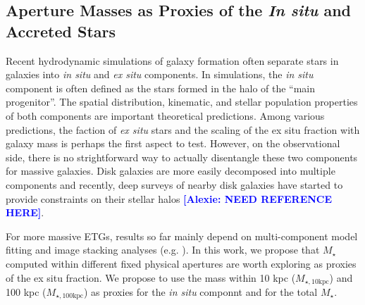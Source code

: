 \documentclass[a4paper,fleqn,usenatbib]{mnras}
\def\mstar{{$M_{\star}$}}
\def\minn{{$M_{\star,10\mathrm{kpc}}$}}
\def\mtot{{$M_{\star,100\mathrm{kpc}}$}}
\newcommand{\alexie}[1]{\textcolor{blue}{\textbf{[Alexie: #1]}}}
\begin{document}

\subsection{Aperture Masses as Proxies of the \textit{In situ} and Accreted Stars}
    \label{ssec:insitu}
    
    Recent hydrodynamic simulations of galaxy formation often separate stars in 
    galaxies into \textit{in situ} and \textit{ex situ} components. 
    In simulations, the \textit{in situ} component is often defined as the stars formed 
    in the halo of the ``main progenitor''.  
    The spatial distribution, kinematic, and stellar population properties of both 
    components are important theoretical predictions. Among various predictions,  the faction of  \textit{ex situ} stars and the scaling of the  ex situ fraction with galaxy mass is perhaps the  first aspect to test. However, on the observational side, there is no strightforward way to actually disentangle these two components for massive galaxies. Disk galaxies  are more easily decomposed into multiple components and recently, deep surveys of nearby disk galaxies have started to provide constraints on their stellar halos \alexie{NEED REFERENCE HERE}.
    
    For more massive ETGs,  results so far mainly depend on multi-component model fitting
    and image stacking analyses (e.g. \citealt{Huang2013a, dSouza2014, Spavone2017}).
    In this work, we propose that \mstar{} computed within different fixed physical apertures are worth exploring as  proxies of the  ex situ fraction. We propose to use the mass within 10 kpc (\minn{}) and 100 kpc (\mtot{}) as proxies for the \textit{in situ} componnt and for the total \mstar{}. 
    
\end{document}
